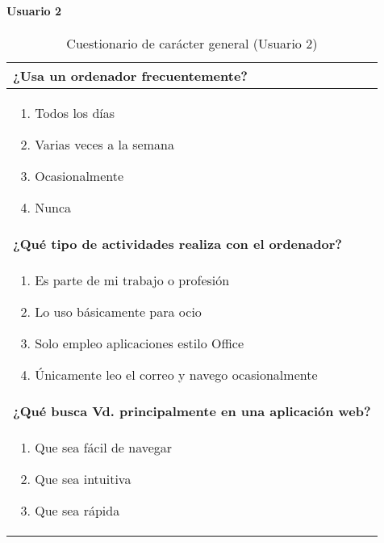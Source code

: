 \paragraph*{Usuario 2}
\begin{table}[H]
\centering
\caption{Cuestionario de carácter general (Usuario 2)}
\begin{tabular}{p{36em}}
\toprule
\rowcolor[rgb]{ .949,  .949,  .949} \textbf{¿Usa un ordenador frecuentemente?} \\ \midrule
\vspace{-4mm}
\begin{enumerate}
\item Todos los días
\item Varias veces a la semana
\item Ocasionalmente
\item Nunca
\end{enumerate} \\ \midrule
\rowcolor[rgb]{ .949,  .949,  .949} \textbf{¿Qué tipo de actividades realiza con el ordenador?} \\ \midrule
\vspace{-4mm}
\begin{enumerate}
\item Es parte de mi trabajo o profesión
\item Lo uso básicamente para ocio
\item Solo empleo aplicaciones estilo Office
\item Únicamente leo el correo y navego ocasionalmente
\end{enumerate} \\ \midrule
\rowcolor[rgb]{ .949,  .949,  .949} \textbf{¿Qué busca Vd. principalmente en una aplicación web?} \\ \midrule
\vspace{-4mm}
\begin{enumerate}
\item Que sea fácil de navegar
\item Que sea intuitiva
\item Que sea rápida
\end{enumerate} \\ \bottomrule
\end{tabular}
\end{table}

